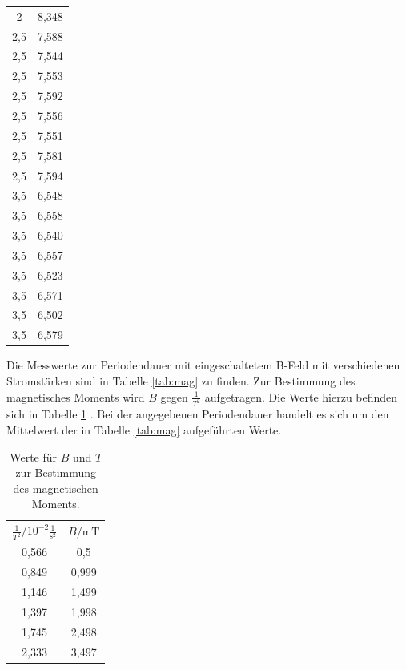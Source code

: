 \begin{table}
\begin{tabular}{c c }
2 & 8,348 \\
2,5 & 7,588 \\
2,5 & 7,544 \\
2,5 & 7,553 \\
2,5 & 7,592 \\
2,5 & 7,556 \\
2,5 & 7,551 \\
2,5 & 7,581 \\
2,5 & 7,594 \\
3,5 & 6,548 \\
3,5 & 6,558 \\
3,5 & 6,540 \\
3,5 & 6,557 \\
3,5 & 6,523 \\
3,5 & 6,571 \\
3,5 & 6,502 \\
3,5 & 6,579 \\
\bottomrule
\end{tabular}
\end{table}

Die Messwerte zur Periodendauer mit eingeschaltetem B-Feld mit verschiedenen Stromstärken sind in Tabelle \ref{tab:mag} zu finden.
Zur Bestimmung des magnetisches Moments wird $B$ gegen $\frac{1}{T^2}$ aufgetragen. Die Werte hierzu befinden sich in Tabelle \ref{tab:mag2} . Bei der angegebenen Periodendauer handelt es sich um den Mittelwert der in Tabelle \ref{tab:mag} aufgeführten Werte.

\begin{table}
  \caption{Werte für $B$ und $T$ zur Bestimmung des magnetischen Moments.}
  \centering
  \label{tab:mag2}
  \begin{tabular}{c c }
    \toprule
    $\frac{1}{T^2} / 10^{-2} \frac{1}{\si{\second}^2}$ & $B/ \si{\milli\tesla}$ \\
    0,566 & 0,5 \\
    0,849 & 0,999 \\
    1,146 & 1,499 \\
    1,397 & 1,998 \\
    1,745 & 2,498 \\
    2,333 & 3,497 \\
    \bottomrule
    \end{tabular}
    \end{table}

